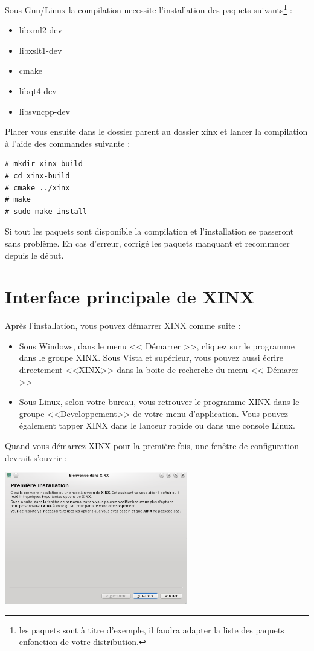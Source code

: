 \documentclass[a4paper,10pt,twoside]{book}
\begin{document}
Sous Gnu/Linux la compilation necessite l'installation des paquets suivants\footnote{les paquets sont à titre d'exemple, il faudra adapter la liste des paquets enfonction de votre distribution.} :
\begin{itemize}
 \item libxml2-dev
 \item libxslt1-dev
 \item cmake
 \item libqt4-dev
 \item libsvncpp-dev 
\end{itemize}

Placer vous ensuite dans le dossier parent au dossier xinx et lancer la compilation à l'aide des commandes suivante :
\begin{verbatim}
# mkdir xinx-build
# cd xinx-build
# cmake ../xinx
# make
# sudo make install
\end{verbatim}

Si tout les paquets sont disponible la compilation et l'installation se passeront sans problème. En cas d'erreur, corrigé les paquets manquant et recommncer depuis le début.

\chapter{Interface principale de XINX}

Après l'installation, vous pouvez démarrer XINX comme suite :
\begin{itemize}
 \item Sous Windows, dans le menu << Démarrer >>, cliquez sur le programme dans le groupe XINX. Sous Vista et supérieur, vous pouvez aussi écrire directement <<XINX>> dans la boite de recherche du menu << Démarer >>
 \item Sous Linux, selon votre bureau, vous retrouver le programme XINX dans le groupe <<Developpement>> de votre menu d'application. Vous pouvez également tapper XINX dans le lanceur rapide ou dans une console Linux. 
\end{itemize}

Quand vous démarrez XINX pour la première fois, une fenêtre de configuration devrait s'ouvrir :

\begin{center}
 \includegraphics[width=0.60\textwidth]{./firstinstall1.png}
\end{center}
\end{document}
